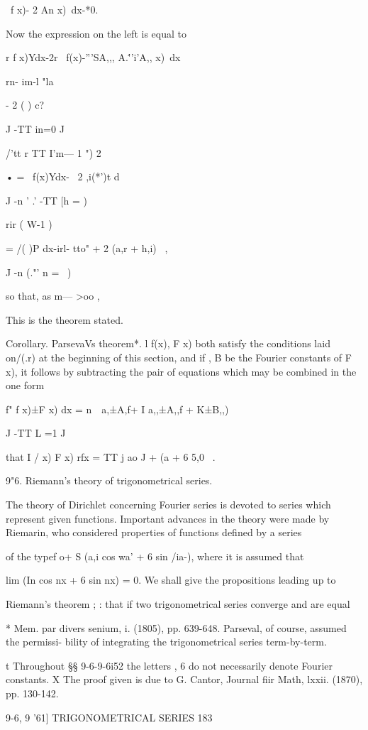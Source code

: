 \ f x)- 2 An x)\ dx-*0.

Now the expression on the left is equal to

r f x)Ydx-2r \ f(x)-'''SA,,, A.\'''i'A,, x)\ dx

rn- im-l "la

- 2 ( ) c?

J -TT in=0 J

/'tt r TT I'm— 1 ") 2

• = \ f(x)Ydx- \ 2 ,i(*')t d

J -n ' .' -TT [h = )

rir ( W-1 )

= /( )P dx-irl- tto" + 2 (a,r + h,i) \ ,

J -n (."' n = \ )

so that, as m— >oo ,

This is the theorem stated.

Corollary. ParsevaVs theorem*. l f(x), F x) both satisfy the
conditions laid on/(.r) at the beginning of this section, and if , B
be the Fourier constants of F x), it follows by subtracting the pair
of equations which may be combined in the one form

f" f x)±F x) dx = n\ \ a,±A,f+ I a,,±A,,f + K±B,,) \

J -TT L =1 J

that I / x) F x) rfx = TT j ao J + (a + 6 5,0 \ .

9"6. Riemann's theory of trigonometrical series.

The theory of Dirichlet concerning Fourier series is devoted to series
which represent given functions. Important advances in the theory were
made by Riemarin, who considered properties of functions defined by a
series

of the typef o+ S (a,i cos wa' + 6 sin /ia-), where it is assumed that

lim (In cos nx + 6 sin nx) = 0. We shall give the propositions leading
up to

Riemann's theorem ; : that if two trigonometrical series converge and
are equal

* Mem. par divers senium, i. (1805), pp. 639-648. Parseval, of course,
assumed the permissi- bility of integrating the trigonometrical series
term-by-term.

t Throughout §§ 9-6-9-6i52 the letters , 6 do not necessarily denote
Fourier constants. X The proof given is due to G. Cantor, Journal fiir
Math, lxxii. (1870), pp. 130-142.

9-6, 9 '61] TRIGONOMETRICAL SERIES 183


